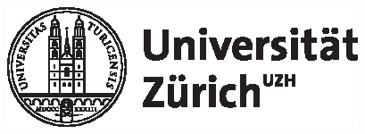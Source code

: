 \begin{titlepage}
    
    

    
    
    \includegraphics[width=.5\textwidth]{images/uzh_logo_d_pos.eps}\\[1cm] %
    
    
    
\end{titlepage}

\newpage~\thispagestyle{empty}\newpage




\tableofcontents
\clearpage